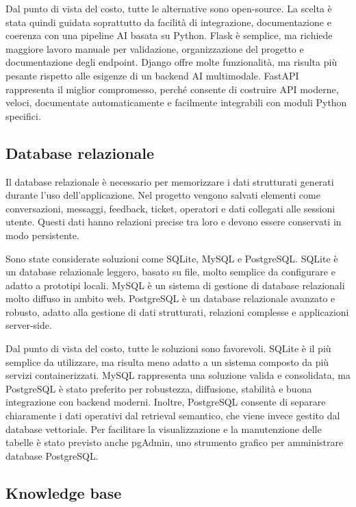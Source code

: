 Dal punto di vista del costo, tutte le alternative sono open-source. La scelta è stata quindi guidata soprattutto da facilità di integrazione, documentazione e coerenza con una pipeline AI basata su Python. Flask è semplice, ma richiede maggiore lavoro manuale per validazione, organizzazione del progetto e documentazione degli endpoint. Django offre molte funzionalità, ma risulta più pesante rispetto alle esigenze di un backend AI multimodale. FastAPI rappresenta il miglior compromesso, perché consente di costruire API moderne, veloci, documentate automaticamente e facilmente integrabili con moduli Python specifici.

\subsection*{Database relazionale}

Il database relazionale è necessario per memorizzare i dati strutturati generati durante l’uso dell’applicazione. Nel progetto vengono salvati elementi come conversazioni, messaggi, feedback, ticket, operatori e dati collegati alle sessioni utente. Questi dati hanno relazioni precise tra loro e devono essere conservati in modo persistente.

Sono state considerate soluzioni come SQLite, MySQL e PostgreSQL. SQLite è un database relazionale leggero, basato su file, molto semplice da configurare e adatto a prototipi locali. MySQL è un sistema di gestione di database relazionali molto diffuso in ambito web. PostgreSQL è un database relazionale avanzato e robusto, adatto alla gestione di dati strutturati, relazioni complesse e applicazioni server-side.

Dal punto di vista del costo, tutte le soluzioni sono favorevoli. SQLite è il più semplice da utilizzare, ma risulta meno adatto a un sistema composto da più servizi containerizzati. MySQL rappresenta una soluzione valida e consolidata, ma PostgreSQL è stato preferito per robustezza, diffusione, stabilità e buona integrazione con backend moderni. Inoltre, PostgreSQL consente di separare chiaramente i dati operativi dal retrieval semantico, che viene invece gestito dal database vettoriale. Per facilitare la visualizzazione e la manutenzione delle tabelle è stato previsto anche pgAdmin, uno strumento grafico per amministrare database PostgreSQL.

\subsection*{Knowledge base}

